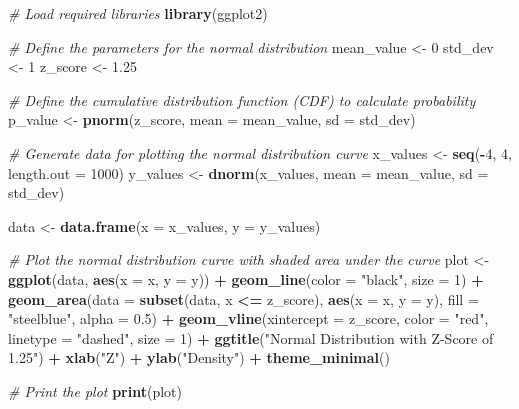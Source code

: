 \documentclass[
  12 pt,
  a4paper,
]{book}
\newenvironment{Shaded}{\begin{snugshade}}{\end{snugshade}}
\newcommand{\AttributeTok}[1]{\textcolor[rgb]{0.13,0.29,0.53}{#1}}
\newcommand{\CommentTok}[1]{\textcolor[rgb]{0.56,0.35,0.01}{\textit{#1}}}
\newcommand{\DecValTok}[1]{\textcolor[rgb]{0.00,0.00,0.81}{#1}}
\newcommand{\FloatTok}[1]{\textcolor[rgb]{0.00,0.00,0.81}{#1}}
\newcommand{\FunctionTok}[1]{\textcolor[rgb]{0.13,0.29,0.53}{\textbf{#1}}}
\newcommand{\NormalTok}[1]{#1}
\newcommand{\OtherTok}[1]{\textcolor[rgb]{0.56,0.35,0.01}{#1}}
\newcommand{\SpecialCharTok}[1]{\textcolor[rgb]{0.81,0.36,0.00}{\textbf{#1}}}
\newcommand{\StringTok}[1]{\textcolor[rgb]{0.31,0.60,0.02}{#1}}
\numberwithin{equation}{section}
\theoremstyle{plain}      %
\theoremstyle{definition} %
\theoremstyle{remark}     %
\theoremstyle{note}         %
\begin{document}
\begin{Shaded}
\begin{Highlighting}[]
\CommentTok{\# Load required libraries}
\FunctionTok{library}\NormalTok{(ggplot2)}

\CommentTok{\# Define the parameters for the normal distribution}
\NormalTok{mean\_value }\OtherTok{\textless{}{-}} \DecValTok{0}
\NormalTok{std\_dev }\OtherTok{\textless{}{-}} \DecValTok{1}
\NormalTok{z\_score }\OtherTok{\textless{}{-}} \FloatTok{1.25}

\CommentTok{\# Define the cumulative distribution function (CDF) to calculate probability}
\NormalTok{p\_value }\OtherTok{\textless{}{-}} \FunctionTok{pnorm}\NormalTok{(z\_score, }\AttributeTok{mean =}\NormalTok{ mean\_value, }\AttributeTok{sd =}\NormalTok{ std\_dev)}

\CommentTok{\# Generate data for plotting the normal distribution curve}
\NormalTok{x\_values }\OtherTok{\textless{}{-}} \FunctionTok{seq}\NormalTok{(}\SpecialCharTok{{-}}\DecValTok{4}\NormalTok{, }\DecValTok{4}\NormalTok{, }\AttributeTok{length.out =} \DecValTok{1000}\NormalTok{)}
\NormalTok{y\_values }\OtherTok{\textless{}{-}} \FunctionTok{dnorm}\NormalTok{(x\_values, }\AttributeTok{mean =}\NormalTok{ mean\_value, }\AttributeTok{sd =}\NormalTok{ std\_dev)}

\NormalTok{data }\OtherTok{\textless{}{-}} \FunctionTok{data.frame}\NormalTok{(}\AttributeTok{x =}\NormalTok{ x\_values, }\AttributeTok{y =}\NormalTok{ y\_values)}

\CommentTok{\# Plot the normal distribution curve with shaded area under the curve}
\NormalTok{plot }\OtherTok{\textless{}{-}} \FunctionTok{ggplot}\NormalTok{(data, }\FunctionTok{aes}\NormalTok{(}\AttributeTok{x =}\NormalTok{ x, }\AttributeTok{y =}\NormalTok{ y)) }\SpecialCharTok{+}
  \FunctionTok{geom\_line}\NormalTok{(}\AttributeTok{color =} \StringTok{"black"}\NormalTok{, }\AttributeTok{size =} \DecValTok{1}\NormalTok{) }\SpecialCharTok{+}
  \FunctionTok{geom\_area}\NormalTok{(}\AttributeTok{data =} \FunctionTok{subset}\NormalTok{(data, x }\SpecialCharTok{\textless{}=}\NormalTok{ z\_score), }\FunctionTok{aes}\NormalTok{(}\AttributeTok{x =}\NormalTok{ x, }\AttributeTok{y =}\NormalTok{ y), }\AttributeTok{fill =} \StringTok{"steelblue"}\NormalTok{, }\AttributeTok{alpha =} \FloatTok{0.5}\NormalTok{) }\SpecialCharTok{+}
  \FunctionTok{geom\_vline}\NormalTok{(}\AttributeTok{xintercept =}\NormalTok{ z\_score, }\AttributeTok{color =} \StringTok{"red"}\NormalTok{, }\AttributeTok{linetype =} \StringTok{"dashed"}\NormalTok{, }\AttributeTok{size =} \DecValTok{1}\NormalTok{) }\SpecialCharTok{+}
  \FunctionTok{ggtitle}\NormalTok{(}\StringTok{"Normal Distribution with Z{-}Score of 1.25"}\NormalTok{) }\SpecialCharTok{+}
  \FunctionTok{xlab}\NormalTok{(}\StringTok{"Z"}\NormalTok{) }\SpecialCharTok{+}
  \FunctionTok{ylab}\NormalTok{(}\StringTok{"Density"}\NormalTok{) }\SpecialCharTok{+}
  \FunctionTok{theme\_minimal}\NormalTok{()}

\CommentTok{\# Print the plot}
\FunctionTok{print}\NormalTok{(plot)}
\end{Highlighting}
\end{Shaded}
\end{document}
